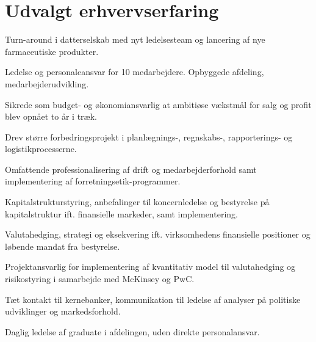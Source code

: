 \documentclass[a4paper]{janus-resume} %
\begin{document}
\hfill
%
%
\begin{minipage}[t]{0.49\textwidth} %


\section{Udvalgt erhvervserfaring}


\vspace{\topsep} %
\begin{tightitemize}
\item Turn-around i datterselskab med nyt ledelsesteam og lancering af nye farmaceutiske produkter. 
\item Ledelse og personaleansvar for 10 medarbejdere. Opbyggede afdeling, medarbejderudvikling.
\item Sikrede som budget- og økonomiansvarlig at ambitiøse vækstmål for salg og profit blev opnået to år i træk.
\item Drev større forbedringsprojekt i planlægnings-, regnskabs-, rapporterings- og logistikprocesserne.
\item Omfattende professionalisering af drift og medarbejderforhold samt implementering af forretningsetik-programmer. 
\end{tightitemize}

\sectionspace %



\begin{tightitemize}
\item Kapitalstrukturstyring, anbefalinger til koncernledelse og bestyrelse på kapitalstruktur ift. finansielle markeder, samt
implementering.
\item Valutahedging, strategi og eksekvering ift. virksomhedens finansielle positioner og løbende mandat fra bestyrelse.
\item Projektansvarlig for implementering af kvantitativ model til valutahedging og risikostyring i samarbejde med McKinsey og PwC. 
\item Tæt kontakt til kernebanker, kommunikation til ledelse af analyser på politiske udviklinger og markedsforhold.
\item Daglig ledelse af graduate i afdelingen, uden direkte personalansvar.
\end{tightitemize}


\end{minipage}
\end{document}
